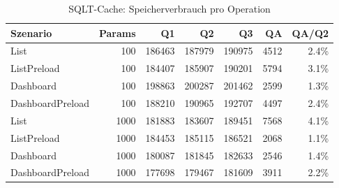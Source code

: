 \begin{table}[ht]
\centering
\caption{SQLT-Cache: Speicherverbrauch pro Operation}
\begin{tabular}{lrrrrrr}
\toprule
Szenario & Params & Q1 & Q2 & Q3 & QA & QA/Q2 \\
\midrule
		List & 100 & 186463 & 187979 & 190975 & 4512 & 2.4\% \\
		ListPreload & 100 & 184407 & 185907 & 190201 & 5794 & 3.1\% \\
		Dashboard & 100 & 198863 & 200287 & 201462 & 2599 & 1.3\% \\
		DashboardPreload & 100 & 188210 & 190965 & 192707 & 4497 & 2.4\% \\
		List & 1000 & 181883 & 183607 & 189451 & 7568 & 4.1\% \\
		ListPreload & 1000 & 184453 & 185115 & 186521 & 2068 & 1.1\% \\
		Dashboard & 1000 & 180087 & 181845 & 182633 & 2546 & 1.4\% \\
		DashboardPreload & 1000 & 177698 & 179467 & 181609 & 3911 & 2.2\% \\
\bottomrule
\end{tabular}
\label{tab:benchmark_sqlt-cache_bytesperop}
\end{table}
	